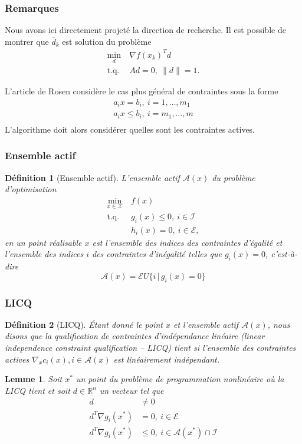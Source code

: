 \documentclass[usepdftitle=false]{beamer}
\newtheorem{defn}{Définition}
\newtheorem{lem}{Lemme}
\def\cA{\mathcal{A}}
\def\cE{\mathcal{E}}
\def\cI{\mathcal{I}}
\def\cX{\mathcal{X}}
\def\RR{\mathbb{R}}
\begin{document}
\begin{frame}
	\frametitle{Remarques}
	
	Nous avons ici directement projeté la direction de recherche. Il est possible de montrer que $\overline{d}_k$ est solution du problème
	\begin{align*}
	\min_{d} \ & \nabla f(x_k)^Td \\
	\mbox{t.q. } & Ad = 0,\ \|d\| = 1.
	\end{align*}
	
	\mbox{}
	
	L'article de Rosen considère le cas plus général de contraintes sous la forme
	\begin{align*}
	a_i x = b_i,\ i = 1,\ldots,m_1 \\
	a_i x \leq b_i,\ i = m_1,\ldots,m \\
	\end{align*}
	L'algorithme doit alors considérer quelles sont les contraintes actives.
	
\end{frame}

\begin{frame}
\frametitle{Ensemble actif}

\begin{defn}[Ensemble actif]
L'ensemble actif $\cA(x)$ du problème d'optimisation
\begin{align*}
\min_{x \in \cX} \ & f(x) \\
\mbox{t.q. } & g_i(x) \leq 0,\ i \in \cI \\
& h_i(x) = 0,\ i \in \cE,
\end{align*}
en un point réalisable $x$ est l'ensemble des indices des contraintes d'égalité et l'ensemble des indices $i$ des contraintes d'inégalité telles que $g_i(x) = 0$, c'est-à-dire
$$
\cA(x) = \cE U \{ i \,|\, g_i(x) = 0 \}
$$
\end{defn}

\end{frame}

\begin{frame}
\frametitle{LICQ}

\begin{defn}[LICQ]
Étant donné le point $x$ et l'ensemble actif $\cA(x)$, nous disons que la qualification de contraintes d'indépendance linéaire (linear
independence constraint qualification -- LICQ) tient si l'ensemble des contraintes actives $\nabla_x c_i(x), i \in \cA(x)$ est linéairement indépendant.
\end{defn}

\begin{lem}
	Soit $x^*$ un point du problème de programmation nonlinéaire où la LICQ tient et soit $d \in \RR^n$ un vecteur tel que
	\begin{align*}
	d & \ne 0 \\
	d^T \nabla g_i(x^*) &= 0,\ i \in \cE \\
	d^T \nabla g_i(x^*) &\leq 0,\ i \in \cA(x^*) \cap \cI
	\end{align*}
\end{lem}

\end{frame}
\end{document}
